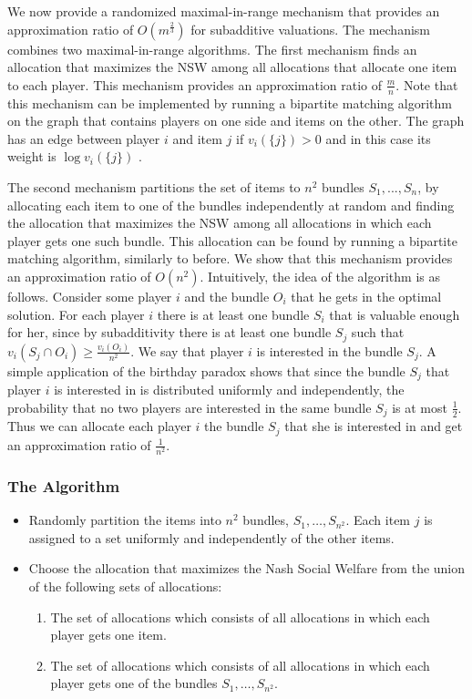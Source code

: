 \documentclass{theoretics}
\begin{document}
We now provide a randomized maximal-in-range mechanism that provides an approximation ratio of $O(m^{\frac 2 3})$ for subadditive valuations. The mechanism combines  two maximal-in-range algorithms. The first mechanism finds an allocation that maximizes the NSW among all allocations that allocate one item to each player. This mechanism provides an approximation ratio of $\frac m n$. Note that this mechanism can be implemented by running a bipartite matching algorithm on the graph that contains players on one side and items on the other. The graph has an edge between player $i$ and item $j$ if $v_i(\{j\})>0$ and in this case its weight is $\log v_i(\{j\})$ .

The second mechanism partitions the set of items to $n^2$ bundles $S_1,...,S_n$, by allocating each item to one of the bundles independently at random and finding the allocation that maximizes the NSW among all allocations in which each player gets one such bundle. This allocation can be found by running a bipartite matching algorithm, similarly to before. We show that this mechanism provides an approximation ratio of $O(n^2)$. Intuitively, the idea of the algorithm is as follows. Consider some player $i$ and the bundle $O_i$ that he gets in the optimal solution. For each player $i$ there is at least one bundle $S_i$ that is valuable enough for her, since by subadditivity there is at least one bundle $S_j$ such that $v_i(S_j\cap O_i)\geq \frac{v_i(O_i)}{n^2}$. We say that player $i$ is interested in the bundle $S_j$. A simple application of the birthday paradox shows that since the bundle $S_j$ that player $i$ is interested in is distributed uniformly and independently, the probability that no two players are interested in the same bundle $S_j$ is at most $\frac 1 2$. Thus we can allocate each player $i$ the bundle $S_j$ that she is interested in and get an approximation ratio of $\frac 1 {n^2}$.


\subsubsection*{The Algorithm}

\begin{itemize}
\item Randomly partition the items into $n^2$ bundles, $S_1,\ldots, S_{n^2}$. Each item $j$ is assigned to a set uniformly and independently of the other items.
\item Choose the allocation that maximizes the Nash Social Welfare from the union of the following sets of allocations:
\begin{enumerate}
\item The set of allocations which consists of all allocations in which each player gets one item.
\item The set of allocations which consists of all allocations in which each player gets one of the bundles $S_1,\ldots, S_{n^2}$.
\end{enumerate}
\end{itemize}
\end{document}
